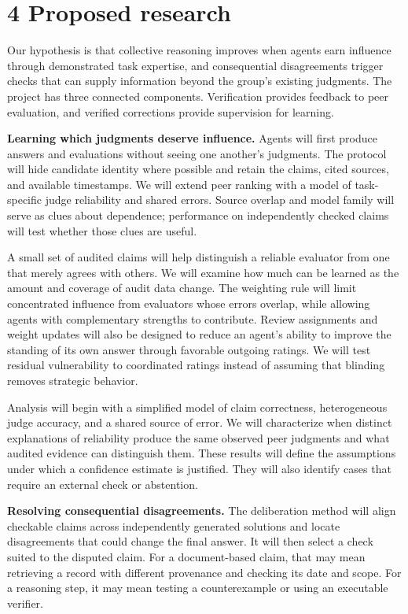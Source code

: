 \documentclass[12pt,letterpaper]{article}
\begin{document}
\section*{4 Proposed research}
Our hypothesis is that collective reasoning improves when agents earn influence through demonstrated task expertise, and consequential disagreements trigger checks that can supply information beyond the group's existing judgments. The project has three connected components. Verification provides feedback to peer evaluation, and verified corrections provide supervision for learning.

\textbf{Learning which judgments deserve influence.} Agents will first produce answers and evaluations without seeing one another's judgments. The protocol will hide candidate identity where possible and retain the claims, cited sources, and available timestamps. We will extend peer ranking with a model of task-specific judge reliability and shared errors. Source overlap and model family will serve as clues about dependence; performance on independently checked claims will test whether those clues are useful.

A small set of audited claims will help distinguish a reliable evaluator from one that merely agrees with others. We will examine how much can be learned as the amount and coverage of audit data change. The weighting rule will limit concentrated influence from evaluators whose errors overlap, while allowing agents with complementary strengths to contribute. Review assignments and weight updates will also be designed to reduce an agent's ability to improve the standing of its own answer through favorable outgoing ratings. We will test residual vulnerability to coordinated ratings instead of assuming that blinding removes strategic behavior.

Analysis will begin with a simplified model of claim correctness, heterogeneous judge accuracy, and a shared source of error. We will characterize when distinct explanations of reliability produce the same observed peer judgments and what audited evidence can distinguish them. These results will define the assumptions under which a confidence estimate is justified. They will also identify cases that require an external check or abstention.

\textbf{Resolving consequential disagreements.} The deliberation method will align checkable claims across independently generated solutions and locate disagreements that could change the final answer. It will then select a check suited to the disputed claim. For a document-based claim, that may mean retrieving a record with different provenance and checking its date and scope. For a reasoning step, it may mean testing a counterexample or using an executable verifier.
\end{document}
